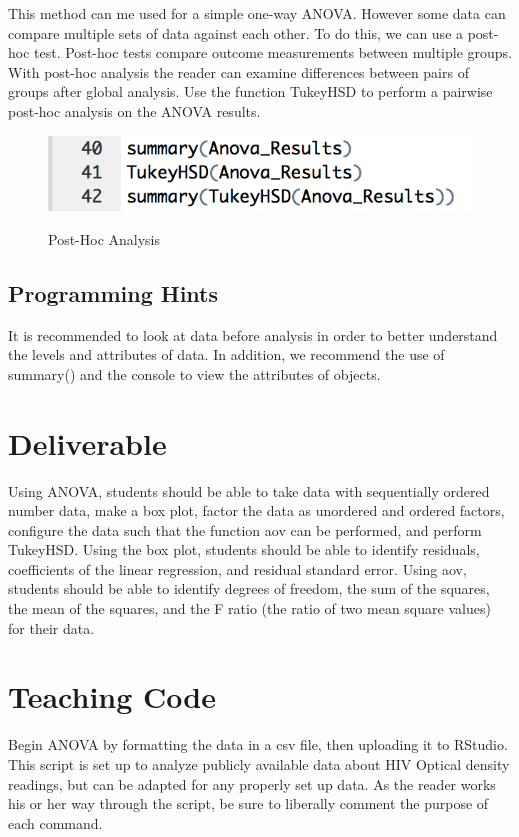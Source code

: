 This method can me used for a simple one-way ANOVA. However some data can compare multiple sets of data against each other. To do this, we can use a post-hoc test. Post-hoc tests compare outcome measurements between multiple groups. With post-hoc analysis the reader can examine differences between pairs of groups after global analysis. Use the function TukeyHSD to perform a pairwise post-hoc analysis on the ANOVA results.
\begin{figure}[H] %
        \centering
        \caption{Post-Hoc Analysis}
        \includegraphics[scale=0.5]{pictures/tukey} 
        \label{fig:tukey}
\end{figure}

 \subsection{Programming Hints}
It is recommended to look at data before analysis in order to better understand the levels and attributes of data.
In addition, we recommend the use of summary() and the console to view the attributes of objects.
 
\section{Deliverable}

Using ANOVA, students should be able to take data with sequentially ordered number data, make a box plot, factor the data as unordered and ordered factors, configure the data such that the function aov can be performed, and perform TukeyHSD.
Using the box plot, students should be able to identify residuals, coefficients of the linear regression, and residual standard error. 
Using aov, students should be able to identify degrees of freedom, the sum of the squares, the mean of the squares, and the F ratio (the ratio of two mean square values) for their data. 

\section{Teaching Code}

Begin ANOVA by formatting the data in a csv file, then uploading it to RStudio.
This script is set up to analyze publicly available data about HIV Optical density readings, but can be adapted for any properly set up data. As the reader works his or her way through the script, be sure to liberally comment the purpose of each command. 

